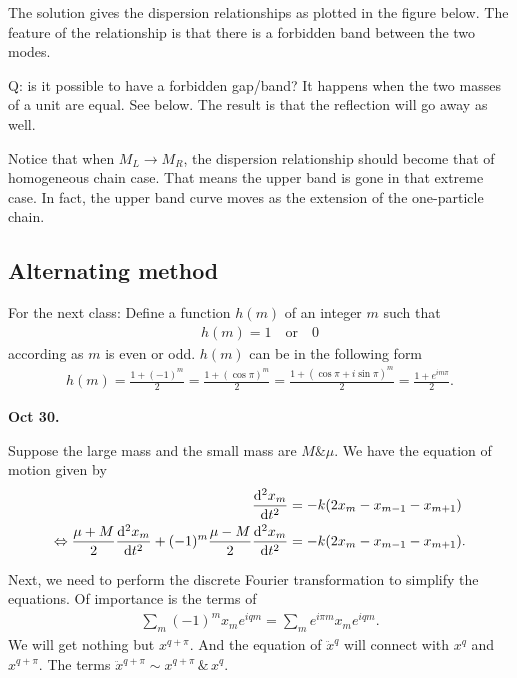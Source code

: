 The solution gives the dispersion relationships as plotted in the figure below. The feature of the relationship is that there is a forbidden band between the two modes. 


Q: is it possible to have a forbidden gap/band? It happens when the two masses of a unit are equal. See below. The result is that the reflection will go away as well.

Notice that when $ M_L\rightarrow M_R $, the dispersion relationship should become that of homogeneous chain case. That means the upper band is gone in that extreme case. In fact, the upper band curve moves as the extension of the one-particle chain. 

\subsection{Alternating method}
For the next class: Define a function $ h(m) $ of an integer $ m $ such that 
\begin{align}
h(m)= 1 \quad \mathrm{or}\quad  0
\end{align}
according as  $ m $ is even or odd. $ h(m) $ can be in the following form
\begin{align}
h(m)=\frac{1+(-1)^m}{2}=\frac{1+(\cos \pi)^m}{2}=\frac{1+(\cos \pi+i\sin \pi)^m}{2}=\frac{1+e^{im\pi}}{2}.
\end{align}

\textbf{Oct 30.}

Suppose the large mass and the small mass are $ M \& \mu $. We have the equation of motion given by
\begin{align}
[M+(\mu - M)(\frac{(1+(-1)^m)}{2}) ]\sdt{x_m} &= -k(2x_m - x_{m-1}-x_{m+1})\\
\Leftrightarrow \frac{\mu + M}{2} \sdt{x_m} + (-1)^m \frac{\mu - M}{2} \sdt{x_m} &= -k(2x_m - x_{m-1}-x_{m+1}).
\end{align}

Next, we need to perform the discrete Fourier transformation to simplify the equations. Of importance is the terms of 
\begin{align}
\sum_m (-1)^m x_m e^{iqm}=\sum_m e^{i\pi m } x_m e^{iqm}.
\end{align}
We will get nothing but $ x^{q+\pi} $. And the equation of $ \ddot{x}^q $ will connect with $ x^q $ and $ x^{q+\pi} $. The terms $ \ddot{x}^{q+\pi} \sim x^{q+\pi}\, \& \, x^q$.  


